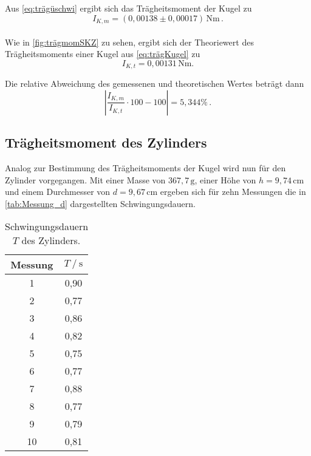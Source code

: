 Aus \eqref{eq:trägüschwi} ergibt sich das Trägheitsmoment der Kugel zu
\begin{equation*}
  I_{K,m} = (0,00138 \pm 0,00017)\, \unit{\newton\meter}  \, .
\end{equation*} \\

Wie in \autoref{fig:trägmomSKZ} zu sehen, ergibt sich der Theoriewert des Trägheitsmoments einer Kugel aus
\eqref{eq:trägKugel}
zu
\begin{equation*}
  I_{K,t} = 0,00131 \, \unit{\newton\meter}. %
\end{equation*}

Die relative Abweichung des gemessenen und theoretischen Wertes beträgt dann
\begin{equation*}
  \left|\frac{I_{K,m}}{I_{K,t}} \cdot 100 - 100 \right| = 5,344 \% \,.
\end{equation*}



\subsection{Trägheitsmoment des Zylinders}
\label{subsec:d}

Analog zur Bestimmung des Trägheitsmoments der Kugel wird nun für den Zylinder vorgegangen. Mit einer Masse von $367,7 \,\unit{\gram}$, einer Höhe von $h = 9,74 \,\unit{\centi\meter}$
und einem Durchmesser von $d = 9,67 \,\unit{\centi\meter}$ ergeben sich für zehn Messungen die in \autoref{tab:Messung_d} dargestellten Schwingungsdauern.

\begin{table}[H]
  \centering
  \begin{tabular}{S[table-format=2.0] S[table-format=1.2]}
      \toprule
      {Messung} & {$T \mathbin{/} \unit{\second}$}\\
        & 0,90 \\
          2  & 0,77 \\
          3  & 0,86 \\
          4  & 0,82 \\  
          5  & 0,75 \\
          6  & 0,77 \\
          7  & 0,88 \\
          8  & 0,77 \\
          9  & 0,79 \\
          10 & 0,81 \\
      \bottomrule
  \end{tabular}
  \caption{Schwingungsdauern $T$ des Zylinders.}
  \label{tab:Messung_d}
\end{table}

